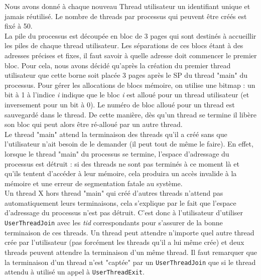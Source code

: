 \documentclass{report}
\begin{document}
Nous avons donné à chaque nouveau Thread utilisateur un identifiant unique et jamais réutilisé. Le nombre de threads par processus qui peuvent être créés est fixé à 50.\\

La pile du processus est découpée en bloc de 3 pages qui sont destinés à accueillir les piles de chaque thread utilisateur. Les séparations de ces blocs étant à des adresses précises et fixes, il faut savoir à quelle adresse doit commencer le premier bloc. Pour cela, nous avons décidé qu'après la création du premier thread utilisateur que cette borne soit placée 3 pages après le SP du thread "main" du processus. Pour gérer les allocations de blocs mémoire, on utilise une bitmap : un bit à 1 à l'indice \textit{i} indique que le bloc \textit{i} est alloué pour un thread utilisateur (et inversement pour un bit à 0). Le numéro de bloc alloué pour un thread est sauvegardé dans le thread. De cette manière, dès qu'un thread se termine il libère son bloc qui peut alors être ré-alloué par un autre thread. \\ 
   
Le thread "main" attend la terminaison des threads qu'il a créé sans que l'utilisateur n'ait besoin de le demander (il peut tout de même le faire). En effet, lorsque le thread "main" du processus se termine, l'espace d'adressage du processus est détruit : si des threads ne sont pas terminés à ce moment là et qu'ils tentent d'accéder à leur mémoire, cela produira un accès invalide à la mémoire et une erreur de segmentation fatale au système.\\
Un thread X hors thread "main" qui créé d'autres threads n'attend pas automatiquement leurs terminaisons, cela s'explique par le fait que l'espace d'adressage du processus n'est pas détruit. C'est donc à l'utilisateur d'utiliser \texttt{UserThreadJoin} avec les \textit{tid} correspondants pour s'assurer de la bonne terminaison de ces threads. Un thread peut attendre n'importe quel autre thread crée par l'utilisateur (pas forcément les threads qu'il a lui même crée) et deux threads peuvent attendre la terminaison d'un même thread. Il faut remarquer que la terminaison d'un thread n'est "captée" par un \texttt{UserThreadJoin} que si le thread attendu à utilisé un appel à \texttt{UserThreadExit}.
 
\end{document}
